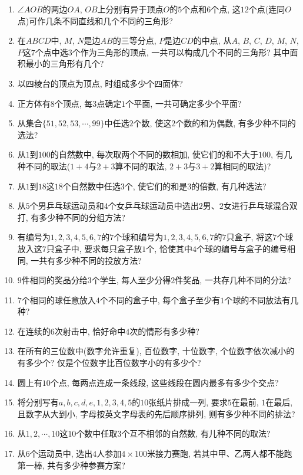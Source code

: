 \documentclass[10pt,a4paper]{article}
\begin{document}
\begin{enumerate}[1.]
\begin{center}
\begin{tikzpicture}[scale = 0.6]
    \end{tikzpicture}
\end{center}
\item $\angle AOB$的两边$OA$, $OB$上分别有异于顶点$O$的$5$个点和$6$个点, 这$12$个点(连同$O$点)可作几条不同直线和几个不同的三角形?
\item 在$ABCD$中, $M$, $N$是边$AB$的三等分点, $P$是边$CD$的中点, 从$A$, $B$, $C$, $D$, $M$, $N$, $P$这$7$个点中选$3$个作为三角形的顶点, 一共可以构成几个不同的三角形? 其中面积最小的三角形有几个?
\item 以四棱台的顶点为顶点, 时组成多少个四面体?
\item 正方体有$8$个顶点, 每$3$点确定$1$个平面, 一共可确定多少个平面?
\item 从集合$\{51,52,53,\cdots ,99\}$中任选$2$个数, 使这$2$个数的和为偶数, 有多少种不同的选法?
\item 从$1$到$100$的自然数中, 每次取两个不同的数相加, 使它们的和不大于$100$, 有几种不同的取法($1+4$与$2+3$算不同的取法, $2+3$与$3+2$算相同的取法)?
\item 从$1$到$18$这$18$个自然数中任选$3$个, 使它们的和是$3$的倍数, 有几种选法?
\item 从$5$个男乒乓球运动员和$4$个女乒乓球运动员中选出$2$男、$2$女进行乒乓球混合双打, 有多少种不同的分组方法?
\item 有编号为$1, 2, 3, 4, 5, 6, 7$的$7$个球和编号为$1, 2, 3, 4, 5, 6, 7$的$7$只盒子, 将这$7$个球放入这$7$只盒子中, 要求每只盒子放$1$个, 恰使其中$4$个球的编号与盒子的编号相同, 一共有多少种不同的投放方法?
\item $9$件相同的奖品分给$3$个学生, 每人至少分得$2$件奖品, 一共存几种不同的分法?
\item $7$个相同的球任意放入$4$个不同的盒子中, 每个盒子至少有$1$个球的不同放法有几种?
\item 在连续的$6$次射击中, 恰好命中$4$次的情形有多少种?
\item 在所有的三位数中(数字允许重复), 百位数字, 十位数字, 个位数字依次减小的有多少个? 仅是个位数字比百位数字小的有多少个?
\item 圆上有$10$个点, 每两点连成一条线段, 这些线段在圆内最多有多少个交点?
\item 将分别写有$a,b,c,d,e,1,2,3,4,5$的$10$张纸片排成一列, 要求$5$在最前, $1$在最后, 且数字从大到小, 字母按英文字母表的先后顺序排列, 则有多少种不同的排法?
\item 从$1, 2,\cdots, 10$这$10$个数中任取$3$个互不相邻的自然数, 有儿种不同的取法?
\item 从$6$个运动员中, 选出$4$人参加$4\times 100$米接力赛跑, 若其中甲、乙两人都不能跑第一棒, 共有多少种参赛方案?

\end{enumerate}
\end{document}

